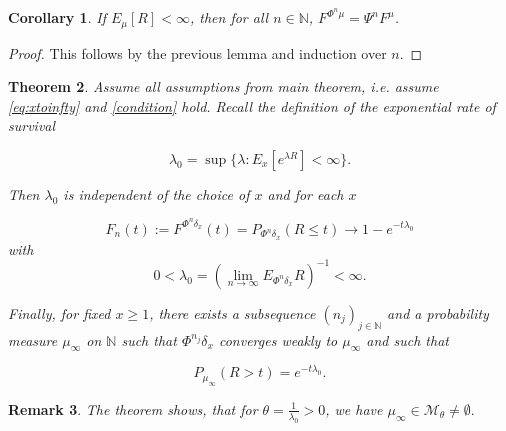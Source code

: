\documentclass[12pt,a4paper]{scrartcl}
\newtheorem{theorem}{Theorem}[section]
\newtheorem{corollary}[theorem]{Corollary}
\newtheorem {remark}[theorem]{Remark}
\numberwithin{equation}{section}
\newcommand{\N}{\mathbb{N}} %
\begin{document}
\begin{corollary} \label{corlinktorenewal}
If $ E_{\mu} \left[R\right] < \infty $, then for all $n \in \N$, $ F^{\Phi^n\mu} = \Psi^n F^{\mu} $.
\end{corollary}
\begin{proof}
This follows by the previous lemma and induction over $n$.
\end{proof}

\begin{theorem} \label{theoremfourone}
Assume all assumptions from main theorem, i.e. assume \eqref{eq:xtoinfty} and \eqref{condition} hold.  Recall the definition of the exponential rate of survival

\begin{equation}
\lambda_0 = \sup \lbrace  \lambda : E_x\left[e^{\lambda R}\right] < \infty \rbrace. 
\end{equation}

Then $\lambda_0$ is independent of the choice of $x$ and for each $x$

$$ F_n\left(t\right) := F^{\Phi^n\delta_x}\left(t\right) = P_{\Phi^n\delta_x}\left(R \leq t\right) \to 1 - e^{-t\lambda_0} $$
with
\begin{equation} \label{eq:limitforlambdazero}
0 < \lambda_0 = \left(\lim_{n \to \infty} E_{\Phi^n\delta_x}R\right)^{-1} < \infty.
\end{equation}

Finally, for fixed $ x \geq 1 $, there exists a subsequence $ \left(n_j\right)_{j \in \N} $ and a probability measure $\mu_{\infty}$ on $\N$ such that $\Phi^{n_j}\delta_x$ converges weakly to $\mu_{\infty}$ and such that

\begin{equation}
\label{eq:existenceofmuinfty}
P_{\mu_{\infty}}\left(R>t\right) = e^{-t\lambda_0}.
\end{equation}

\end{theorem} 

\begin{remark}
The theorem shows, that for $\theta = \frac{1}{\lambda_0} > 0$, we have $\mu_{\infty} \in \mathcal{M}_{\theta} \neq \emptyset.$
\end{remark}
\end{document}
